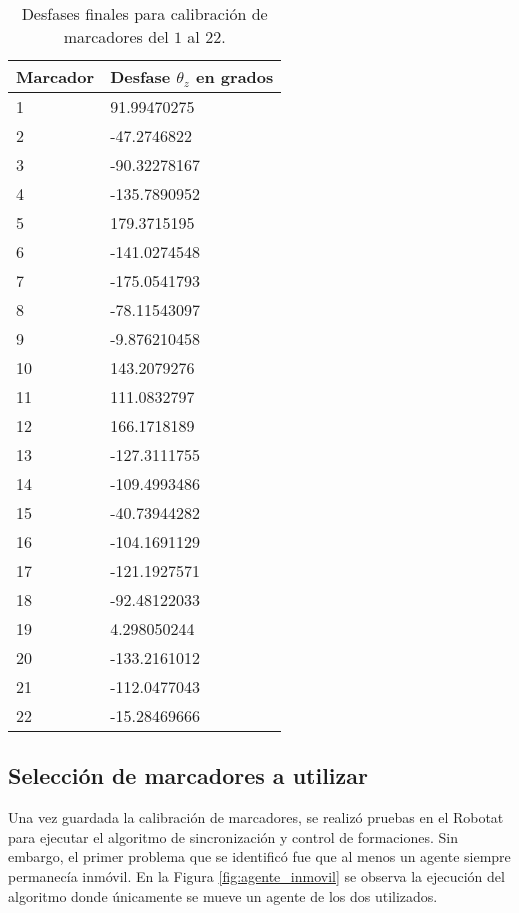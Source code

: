 \begin{table}[!ht]
	\centering
	\begin{tabular}{|l|l|}
		\hline
		\textbf{Marcador} & \textbf{Desfase $\theta_z$ en grados} \\ \hline
		1 & 91.99470275 \\ \hline
		2 & -47.2746822 \\ \hline
		3 & -90.32278167 \\ \hline
		4 & -135.7890952 \\ \hline
		5 & 179.3715195 \\ \hline
		6 & -141.0274548 \\ \hline
		7 & -175.0541793 \\ \hline
		8 & -78.11543097 \\ \hline
		9 & -9.876210458 \\ \hline
		10 & 143.2079276 \\ \hline
		11 & 111.0832797 \\ \hline
		12 & 166.1718189 \\ \hline
		13 & -127.3111755 \\ \hline
		14 & -109.4993486 \\ \hline
		15 & -40.73944282 \\ \hline
		16 & -104.1691129 \\ \hline
		17 & -121.1927571 \\ \hline
		18 & -92.48122033 \\ \hline
		19 & 4.298050244 \\ \hline
		20 & -133.2161012 \\ \hline
		21 & -112.0477043 \\ \hline
		22 & -15.28469666 \\ \hline
	\end{tabular}
	\caption{Desfases finales para calibración de marcadores del $1$ al $22$.}
	\label{cuadro:desfases_finales}
\end{table}

\subsection{Selección de marcadores a utilizar}
Una vez guardada la calibración de marcadores, se realizó pruebas en el Robotat para ejecutar el algoritmo de sincronización y control de formaciones. Sin embargo, el primer problema que se identificó fue que al menos un agente siempre permanecía inmóvil. En la Figura \ref{fig:agente_inmovil} se observa la ejecución del algoritmo donde únicamente se mueve un agente de los dos utilizados.

